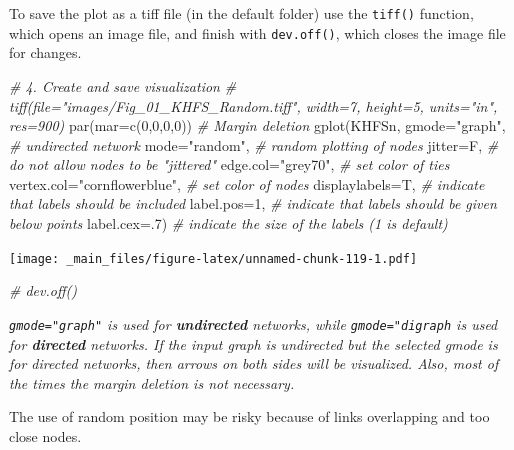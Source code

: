 \documentclass[
  notitlepage,
  onecolumn,
  openany]{book}
\newenvironment{Shaded}{\begin{snugshade}}{\end{snugshade}}
\newcommand{\AttributeTok}[1]{\textcolor[rgb]{0.77,0.63,0.00}{#1}}
\newcommand{\CommentTok}[1]{\textcolor[rgb]{0.56,0.35,0.01}{\textit{#1}}}
\newcommand{\DecValTok}[1]{\textcolor[rgb]{0.00,0.00,0.81}{#1}}
\newcommand{\FunctionTok}[1]{\textcolor[rgb]{0.00,0.00,0.00}{#1}}
\newcommand{\NormalTok}[1]{#1}
\newcommand{\StringTok}[1]{\textcolor[rgb]{0.31,0.60,0.02}{#1}}
\begin{document}
To save the plot as a tiff file (in the default folder) use the \texttt{tiff()} function, which opens an image file,
and finish with \texttt{dev.off()}, which closes the image file for changes.

\begin{Shaded}
\begin{Highlighting}[]
\CommentTok{\# 4. Create and save visualization}
\CommentTok{\# tiff(file="images/Fig\_01\_KHFS\_Random.tiff", width=7, height=5, units="in", res=900)}
\FunctionTok{par}\NormalTok{(}\AttributeTok{mar=}\FunctionTok{c}\NormalTok{(}\DecValTok{0}\NormalTok{,}\DecValTok{0}\NormalTok{,}\DecValTok{0}\NormalTok{,}\DecValTok{0}\NormalTok{)) }\CommentTok{\# Margin deletion}
\FunctionTok{gplot}\NormalTok{(KHFSn,}
      \AttributeTok{gmode=}\StringTok{"graph"}\NormalTok{,      }\CommentTok{\# undirected network}
      \AttributeTok{mode=}\StringTok{"random"}\NormalTok{,      }\CommentTok{\# random plotting of nodes}
      \AttributeTok{jitter=}\NormalTok{F,           }\CommentTok{\# do not allow nodes to be "jittered"}
      \AttributeTok{edge.col=}\StringTok{"grey70"}\NormalTok{,  }\CommentTok{\# set color of ties}
      \AttributeTok{vertex.col=}\StringTok{"cornflowerblue"}\NormalTok{,   }\CommentTok{\# set color of nodes}
      \AttributeTok{displaylabels=}\NormalTok{T,    }\CommentTok{\# indicate that labels should be included}
      \AttributeTok{label.pos=}\DecValTok{1}\NormalTok{,        }\CommentTok{\# indicate that labels should be given below points}
      \AttributeTok{label.cex=}\NormalTok{.}\DecValTok{7}\NormalTok{)       }\CommentTok{\# indicate the size of the labels (1 is default)}
\end{Highlighting}
\end{Shaded}

\texttt{[image: \_main\_files/figure-latex/unnamed-chunk-119-1.pdf]}

\begin{Shaded}
\begin{Highlighting}[]
\CommentTok{\# dev.off()}
\end{Highlighting}
\end{Shaded}

\emph{\texttt{gmode="graph"} is used for \textbf{undirected} networks, while \texttt{gmode="digraph} is used for \textbf{directed} networks. If the input graph is undirected but the selected gmode is for directed networks, then arrows on both sides will be visualized. Also, most of the times the margin deletion is not necessary.}

The use of random position may be risky because of links overlapping and too close nodes.
\end{document}
